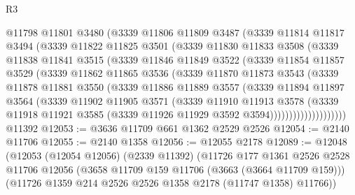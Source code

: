 \begin{lexlean}{R3}
\begin{coremodule}
            @11798
            @11801
            @3480
            (@3339
              @11806
              @11809
              @3487
              (@3339
                @11814
                @11817
                @3494
                (@3339
                  @11822
                  @11825
                  @3501
                  (@3339
                    @11830
                    @11833
                    @3508
                    (@3339
                      @11838
                      @11841
                      @3515
                      (@3339
                        @11846
                        @11849
                        @3522
                        (@3339
                          @11854
                          @11857
                          @3529
                          (@3339
                            @11862
                            @11865
                            @3536
                            (@3339
                              @11870
                              @11873
                              @3543
                              (@3339
                                @11878
                                @11881
                                @3550
                                (@3339
                                  @11886
                                  @11889
                                  @3557
                                  (@3339
                                    @11894
                                    @11897
                                    @3564
                                    (@3339
                                      @11902
                                      @11905
                                      @3571
                                      (@3339
                                        @11910
                                        @11913
                                        @3578
                                        (@3339
                                          @11918
                                          @11921
                                          @3585
                                          (@3339 @11926 @11929 @3592 @3594))))))))))))))))))))
    @11392
@12053 := @3636 @11709 @661 @1362 @2529 @2526
@12054 := @2140 @11706
@12055 := @2140 @1358
@12056 := @12055 @2178
@12089 := @12048
    (@12053
      (@12054 @12056)
      (@2339 @11392)
      (@11726
        @177
        @1361
        @2526
        @2528
        @11706
        @12056
        (@3658 @11709 @159 @11706 (@3663 (@3664 @11709 @159)))
        (@11726 @1359 @214 @2526 @2526 @1358 @2178 (@11747 @1358) @11766))

\end{coremodule}
\end{lexlean}
